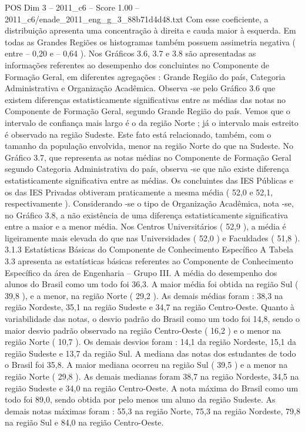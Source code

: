 \begin{textsample}{POS Dim 3 – 2011\_c6 – Score 1.00 – 2011\_c6/enade\_2011\_eng\_g\_3\_88b71d4d48.txt}
Com esse coeficiente, a distribuição apresenta uma concentração à direita e cauda maior à esquerda.
Em todas as Grandes Regiões os histogramas também possuem assimetria negativa ( entre – 0,20 e – 0,64 ).
Nos Gráficos 3.6, 3.7 e 3.8 são apresentadas as informações referentes ao desempenho dos concluintes no Componente de Formação Geral, em diferentes agregações : Grande Região do país, Categoria Administrativa e Organização Acadêmica.
Observa -se pelo Gráfico 3.6 que existem diferenças estatisticamente significativas entre as médias das notas no Componente de Formação Geral, segundo Grande Região do país.
Vemos que o intervalo de confiança mais largo é o da região Norte ; já o intervalo mais estreito é observado na região Sudeste.
Este fato está relacionado, também, com o tamanho da população envolvida, menor na região Norte do que na Sudeste.
No Gráfico 3.7, que representa as notas médias no Componente de Formação Geral segundo Categoria Administrativa do país, observa -se que não existe diferença estatisticamente significativa entre as médias.
Os concluintes das IES Públicas e os das IES Privadas obtiveram praticamente a mesma média ( 52,0 e 52,1, respectivamente ).
Considerando -se o tipo de Organização Acadêmica, nota -se, no Gráfico 3.8, a não existência de uma diferença estatisticamente significativa entre a maior e a menor média.
Nos Centros Universitários ( 52,9 ), a média é ligeiramente mais elevada do que nas Universidades ( 52,0 ) e Faculdades ( 51,8 ). 3.1.3 Estatísticas Básicas do Componente de Conhecimento Específico A Tabela 3.3 apresenta as estatísticas básicas referentes ao Componente de Conhecimento Específico da área de Engenharia – Grupo III.
A média do desempenho dos alunos do Brasil como um todo foi 36,3.
A maior média foi obtida na região Sul ( 39,8 ), e a menor, na região Norte ( 29,2 ).
As demais médias foram : 38,3 na região Nordeste, 35,1 na região Sudeste e 34,7 na região Centro-Oeste.
Quanto à variabilidade das notas, o desvio padrão do Brasil como um todo foi 14,8, sendo o maior desvio padrão observado na região Centro-Oeste ( 16,2 ) e o menor na região Norte ( 10,7 ).
Os demais desvios foram : 14,1 da região Nordeste, 15,1 da região Sudeste e 13,7 da região Sul.
A mediana das notas dos estudantes de todo o Brasil foi 35,8.
A maior mediana ocorreu na região Sul ( 39,5 ) e a menor na região Norte ( 29,8 ).
As demais medianas foram 38,7 na região Nordeste, 34,5 na região Sudeste e 34,0 na região Centro-Oeste.
A nota máxima do Brasil como um todo foi 89,0, sendo obtida por pelo menos um aluno da região Sudeste.
As demais notas máximas foram : 55,3 na região Norte, 75,3 na região Nordeste, 79,8 na região Sul e 84,0 na região Centro-Oeste.

\end{textsample}
